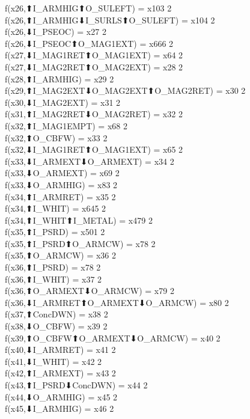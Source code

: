 f(x26,⬆I_ARMHIG⬆O_SULEFT) = x103 {2} \\
f(x26,⬆I_ARMHIG⬇I_SURLS⬆O_SULEFT) = x104 {2} \\
f(x26,⬇I_PSEOC) = x27 {2} \\
f(x26,⬇I_PSEOC⬆O_MAG1EXT) = x666 {2} \\
f(x27,⬇I_MAG1RET⬆O_MAG1EXT) = x64 {2} \\
f(x27,⬇I_MAG2RET⬆O_MAG2EXT) = x28 {2} \\
f(x28,⬆I_ARMHIG) = x29 {2} \\
f(x29,⬆I_MAG2EXT⬇O_MAG2EXT⬆O_MAG2RET) = x30 {2} \\
f(x30,⬇I_MAG2EXT) = x31 {2} \\
f(x31,⬆I_MAG2RET⬇O_MAG2RET) = x32 {2} \\
f(x32,⬆I_MAG1EMPT) = x68 {2} \\
f(x32,⬆O_CBFW) = x33 {2} \\
f(x32,⬇I_MAG1RET⬆O_MAG1EXT) = x65 {2} \\
f(x33,⬇I_ARMEXT⬇O_ARMEXT) = x34 {2} \\
f(x33,⬇O_ARMEXT) = x69 {2} \\
f(x33,⬇O_ARMHIG) = x83 {2} \\
f(x34,⬆I_ARMRET) = x35 {2} \\
f(x34,⬆I_WHIT) = x645 {2} \\
f(x34,⬆I_WHIT⬆I_METAL) = x479 {2} \\
f(x35,⬆I_PSRD) = x501 {2} \\
f(x35,⬆I_PSRD⬆O_ARMCW) = x78 {2} \\
f(x35,⬆O_ARMCW) = x36 {2} \\
f(x36,⬆I_PSRD) = x78 {2} \\
f(x36,⬆I_WHIT) = x37 {2} \\
f(x36,⬆O_ARMEXT⬇O_ARMCW) = x79 {2} \\
f(x36,⬇I_ARMRET⬆O_ARMEXT⬇O_ARMCW) = x80 {2} \\
f(x37,⬆ConcDWN) = x38 {2} \\
f(x38,⬇O_CBFW) = x39 {2} \\
f(x39,⬆O_CBFW⬆O_ARMEXT⬇O_ARMCW) = x40 {2} \\
f(x40,⬇I_ARMRET) = x41 {2} \\
f(x41,⬇I_WHIT) = x42 {2} \\
f(x42,⬆I_ARMEXT) = x43 {2} \\
f(x43,⬆I_PSRD⬇ConcDWN) = x44 {2} \\
f(x44,⬇O_ARMHIG) = x45 {2} \\
f(x45,⬇I_ARMHIG) = x46 {2} \\
